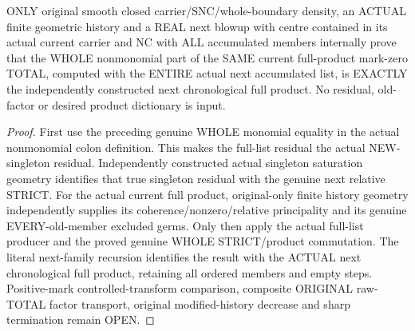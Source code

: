 \begin{theorem}
\label{hir:sharp-original-next-total-all-accumulated-residual-product-dictionary}
\leanok
ONLY original smooth closed carrier/SNC/whole-boundary density, an ACTUAL
finite geometric history and a REAL next blowup with centre contained in
its actual current carrier and NC with ALL accumulated members internally
prove that the WHOLE nonmonomial part of the SAME current full-product
mark-zero TOTAL, computed with the ENTIRE actual next accumulated list,
is EXACTLY the independently constructed next chronological full product.
No residual, old-factor or desired product dictionary is input.
\end{theorem}
\begin{proof}
First use the preceding genuine WHOLE monomial equality in the actual
nonmonomial colon definition. This makes the full-list residual the actual
NEW-singleton residual. Independently constructed actual singleton saturation
geometry identifies that true singleton residual with the genuine next
relative STRICT. For the actual current full product, original-only finite
history geometry independently supplies its coherence/nonzero/relative
principality and its genuine EVERY-old-member excluded germs. Only then
apply the actual full-list producer and the proved genuine WHOLE
STRICT/product commutation. The literal next-family recursion identifies
the result with the ACTUAL next chronological full product, retaining all
ordered members and empty steps. Positive-mark controlled-transform
comparison, composite ORIGINAL raw-TOTAL factor transport, original
modified-history decrease and sharp termination remain OPEN.
\end{proof}

